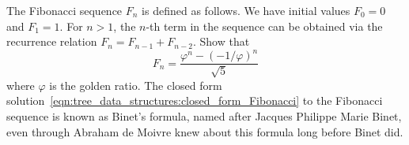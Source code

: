 \begin{problem}
\item The Fibonacci sequence $F_n$ is
  defined as follows. We have initial values $F_0 = 0$ and
  $F_1 = 1$. For $n > 1$, the $n$-th term in the sequence can be
  obtained via the recurrence relation
  $F_n = F_{n-1} + F_{n-2}$. Show that
  \begin{equation}
  \label{eqn:tree_data_structures:closed_form_Fibonacci}
  F_n
  =
  \frac{\varphi^n - (-1 / \varphi)^n} {\sqrt{5}}
  \end{equation}
  where $\varphi$ is the golden ratio. The closed
  form solution~\eqref{eqn:tree_data_structures:closed_form_Fibonacci}
  to the Fibonacci sequence is known as Binet's
  formula, named after Jacques Philippe Marie
  Binet, even through Abraham de
  Moivre knew about this formula long before
  Binet did.
\end{problem}
